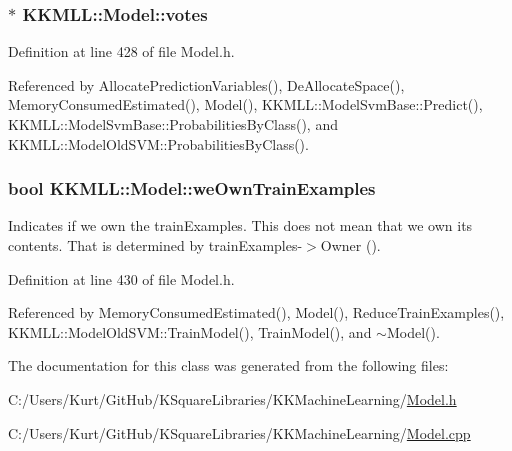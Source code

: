 \subsubsection[{\texorpdfstring{votes}{votes}}]{$\ast$ K\+K\+M\+L\+L\+::\+Model\+::votes\hspace{0.3cm}{\ttfamily [protected]}}\hypertarget{class_k_k_m_l_l_1_1_model_a7d13e2ff97ace39ec4423fd4bfa9ecf2}{}\label{class_k_k_m_l_l_1_1_model_a7d13e2ff97ace39ec4423fd4bfa9ecf2}


Definition at line 428 of file Model.\+h.



Referenced by Allocate\+Prediction\+Variables(), De\+Allocate\+Space(), Memory\+Consumed\+Estimated(), Model(), K\+K\+M\+L\+L\+::\+Model\+Svm\+Base\+::\+Predict(), K\+K\+M\+L\+L\+::\+Model\+Svm\+Base\+::\+Probabilities\+By\+Class(), and K\+K\+M\+L\+L\+::\+Model\+Old\+S\+V\+M\+::\+Probabilities\+By\+Class().

\subsubsection[{\texorpdfstring{we\+Own\+Train\+Examples}{weOwnTrainExamples}}]{\setlength{\rightskip}{0pt plus 5cm}bool K\+K\+M\+L\+L\+::\+Model\+::we\+Own\+Train\+Examples\hspace{0.3cm}{\ttfamily [protected]}}\hypertarget{class_k_k_m_l_l_1_1_model_a37d14ebcf440a6e96256b08873fa355c}{}\label{class_k_k_m_l_l_1_1_model_a37d14ebcf440a6e96256b08873fa355c}
Indicates if we own the \textquotesingle{}train\+Examples\textquotesingle{}. This does not mean that we own its contents. That is determined by \textquotesingle{}train\+Examples-\/$>$Owner ()\textquotesingle{}. 

Definition at line 430 of file Model.\+h.



Referenced by Memory\+Consumed\+Estimated(), Model(), Reduce\+Train\+Examples(), K\+K\+M\+L\+L\+::\+Model\+Old\+S\+V\+M\+::\+Train\+Model(), Train\+Model(), and $\sim$\+Model().



The documentation for this class was generated from the following files\+:\begin{DoxyCompactItemize}
\item 
C\+:/\+Users/\+Kurt/\+Git\+Hub/\+K\+Square\+Libraries/\+K\+K\+Machine\+Learning/\hyperlink{_model_8h}{Model.\+h}\item 
C\+:/\+Users/\+Kurt/\+Git\+Hub/\+K\+Square\+Libraries/\+K\+K\+Machine\+Learning/\hyperlink{_model_8cpp}{Model.\+cpp}\end{DoxyCompactItemize}
